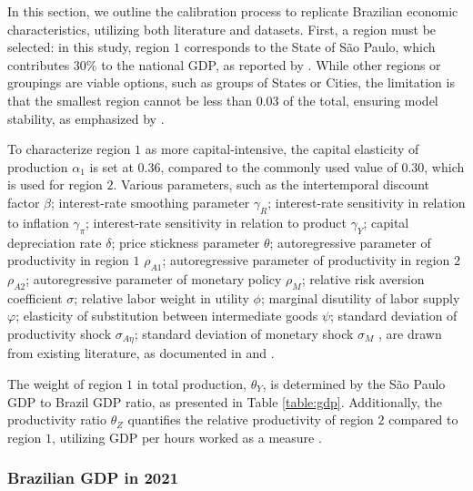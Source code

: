 \documentclass[../thesis.tex]{subfiles}
\begin{document}
In this section, we outline the calibration process to replicate Brazilian economic characteristics, utilizing both literature and datasets. First, a region must be selected: in this study, region $1$ corresponds to the State of São Paulo, which contributes $30\%$ to the national GDP, as reported by \textcite{ibge_produto_2024}. While other regions or groupings are viable options, such as groups of States or Cities, the limitation is that the smallest region cannot be less than $0.03$ of the total, ensuring model stability, as emphasized by \textcite{konopkova_pitfalls_2019}.

To characterize region $1$ as more capital-intensive, the capital elasticity of production $\alpha_{1}$ is set at $0.36$, compared to the commonly used value of $0.30$, which is used for region $2$. Various parameters, such as the 
intertemporal discount factor $\beta$; 
interest-rate smoothing parameter $\gamma_{R}$; 
interest-rate sensitivity in relation to inflation $\gamma_{\pi}$; 
interest-rate sensitivity in relation to product $\gamma_{Y}$; 
capital depreciation rate $\delta$; 
price stickness parameter $\theta$;
autoregressive parameter of productivity in region $1$ $\rho_{A1}$;
autoregressive parameter of productivity in region $2$ $\rho_{A2}$;
autoregressive parameter of monetary policy $\rho_{M}$;
relative risk aversion coefficient $\sigma$;
relative labor weight in utility $\phi$;
marginal disutility of labor supply $\varphi$;
elasticity of substitution between intermediate goods $\psi$;
standard deviation of productivity shock $\sigma_{A\eta}$;
standard deviation of monetary shock $\sigma_{M}$
, are drawn from existing literature, as documented in \textcite{costa_junior_understanding_2016} and \textcite{pereira_rbc_2021}.

The weight of region $1$ in total production, $\theta_{Y}$, is determined by the São Paulo GDP to Brazil GDP ratio, as presented in Table \eqref{table:gdp}. Additionally, the productivity ratio $\theta_{Z}$ quantifies the relative productivity of region $2$ compared to region $1$, utilizing GDP per hours worked as a measure \cite{krugman_defining_1997}.

\newpage


\subsubsection{Brazilian GDP in 2021}
\end{document}
